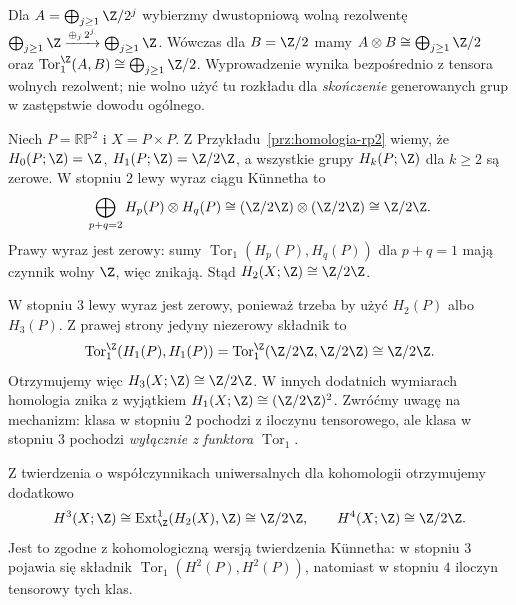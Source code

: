 \begin{przyklad}
Dla $A=\bigoplus_{j\ge1}\Z/2^j$ wybierzmy dwustopniową wolną
rezolwentę
$\bigoplus_{j\ge1}\Z\xrightarrow{\oplus_j\,2^j}
 \bigoplus_{j\ge1}\Z$.
Wówczas dla $B=\Z/2$ mamy
$A\otimes B\cong\bigoplus_{j\ge1}\Z/2$ oraz
$\operatorname{Tor}^{\Z}_1(A,B)\cong\bigoplus_{j\ge1}\Z/2$.
Wyprowadzenie wynika bezpośrednio z tensora wolnych rezolwent;
nie wolno użyć tu rozkładu dla \emph{skończenie} generowanych
grup w zastępstwie dowodu ogólnego.
\end{przyklad}


\begin{przyklad}
\label{prz:kunneth-rp2-razy-rp2}
Niech $P=\mathbb{RP}^2$ i $X=P\times P$.
Z Przykładu~\ref{prz:homologia-rp2} wiemy, że
$H_0(P;\Z)=\Z$, $H_1(P;\Z)=\Z/2\Z$,
a wszystkie grupy $H_k(P;\Z)$ dla $k\geq2$ są zerowe.
W stopniu $2$ lewy wyraz ciągu Künnetha to
\[
 \bigoplus_{p+q=2}H_p(P)\otimes H_q(P)
 \cong(\Z/2\Z)\otimes(\Z/2\Z)
 \cong\Z/2\Z.
\]
Prawy wyraz jest zerowy: sumy
$\operatorname{Tor}_1(H_p(P),H_q(P))$ dla $p+q=1$
mają czynnik wolny $\Z$, więc znikają.
Stąd $H_2(X;\Z)\cong\Z/2\Z$.

W stopniu $3$ lewy wyraz jest zerowy,
ponieważ trzeba by użyć $H_2(P)$ albo $H_3(P)$.
Z prawej strony jedyny niezerowy składnik to
\[
 \operatorname{Tor}_1^\Z(H_1(P),H_1(P))
 =\operatorname{Tor}_1^\Z(\Z/2\Z,\Z/2\Z)
 \cong\Z/2\Z.
\]
Otrzymujemy więc $H_3(X;\Z)\cong\Z/2\Z$.
W innych dodatnich wymiarach homologia znika
z wyjątkiem $H_1(X;\Z)\cong(\Z/2\Z)^2$.
Zwróćmy uwagę na mechanizm: klasa w stopniu $2$
pochodzi z iloczynu tensorowego, ale klasa
w stopniu $3$ pochodzi \emph{wyłącznie z funktora
$\operatorname{Tor}_1$}.

Z twierdzenia o współczynnikach uniwersalnych
dla kohomologii otrzymujemy dodatkowo
\[
 H^3(X;\Z)\cong
 \operatorname{Ext}^1_\Z(H_2(X),\Z)
 \cong\Z/2\Z,
 \qquad H^4(X;\Z)\cong\Z/2\Z.
\]
Jest to zgodne z kohomologiczną wersją twierdzenia
Künnetha: w stopniu $3$ pojawia się składnik
$\operatorname{Tor}_1(H^2(P),H^2(P))$, natomiast
w stopniu $4$ iloczyn tensorowy tych klas.
\end{przyklad}

